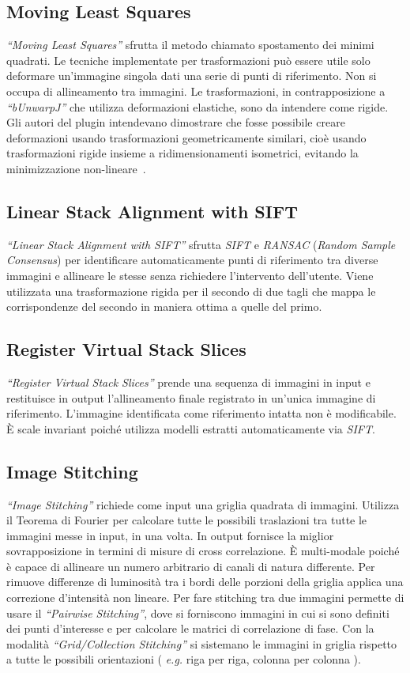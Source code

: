 \subsection{Moving Least Squares}
\noindent \textit{``Moving Least Squares''} sfrutta il metodo chiamato spostamento dei minimi quadrati. Le tecniche implementate per trasformazioni può essere utile solo deformare un'immagine singola dati una serie di punti di riferimento. Non si occupa di allineamento tra immagini. Le trasformazioni, in contrapposizione a \textit{``bUnwarpJ''} che utilizza deformazioni elastiche, sono da intendere come rigide. Gli autori del plugin intendevano dimostrare che fosse possibile creare deformazioni usando trasformazioni geometricamente similari, cioè usando trasformazioni rigide insieme a ridimensionamenti isometrici, evitando la minimizzazione non-lineare~\cite{10.1145/1141911.1141920}.

\subsection{Linear Stack Alignment with SIFT}
\noindent \textit{``Linear Stack Alignment with SIFT''} sfrutta \textit{SIFT} e \textit{RANSAC} (\textit{Random Sample Consensus}) per identificare automaticamente punti di riferimento tra diverse immagini e allineare le stesse senza richiedere l'intervento dell'utente. Viene utilizzata una trasformazione rigida per il secondo di due tagli che mappa le corrispondenze del secondo in maniera ottima a quelle del primo.

\subsection{Register Virtual Stack Slices}
\noindent \textit{``Register Virtual Stack Slices''} prende una sequenza di immagini in input e restituisce in output l'allineamento finale registrato in un'unica immagine di riferimento. L'immagine identificata come riferimento intatta non è modificabile. È scale invariant poiché utilizza modelli estratti automaticamente via \textit{SIFT}.

\subsection{Image Stitching}
\noindent \textit{``Image Stitching''} richiede come input una griglia quadrata di immagini. Utilizza il Teorema di Fourier per calcolare tutte le possibili traslazioni tra tutte le immagini messe in input, in una volta. In output fornisce la miglior sovrapposizione in termini di misure di cross correlazione. È multi-modale poiché è capace di allineare un numero arbitrario di canali di natura differente. Per rimuove differenze di luminosità tra i bordi delle porzioni della griglia applica una correzione d'intensità non lineare. Per fare stitching tra due immagini permette di usare il \textit{``Pairwise Stitching''}, dove si forniscono immagini in cui si sono definiti dei punti d'interesse e per calcolare le matrici di correlazione di fase.
Con la modalità \textit{``Grid/Collection Stitching''} si sistemano le immagini in griglia rispetto a tutte le possibili orientazioni ( \textit{e.g.} riga per riga, colonna per colonna ).


